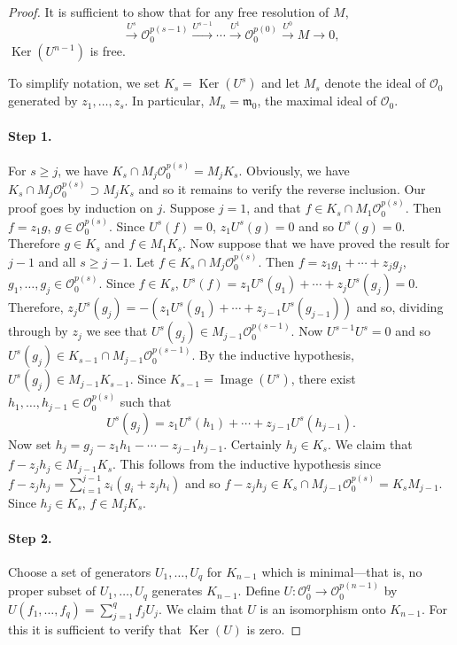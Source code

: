 \begin{proof}
It is sufficient to show that for any free resolution of $M$,
\[\xrightarrow{U^s}\mathcal O_0^{p(s-1)}\xrightarrow{U^{s-1}}\cdots\xrightarrow{U^1}\mathcal O_0^{p(0)}\xrightarrow{U^0}M\to0,\]
$\operatorname{Ker}(U^{n-1})$ is free.

To simplify notation, we set $K_s=\operatorname{Ker}(U^s)$ and let $M_s$ denote the ideal of $\mathcal O_0$ generated by $z_1,\ldots,z_s$. In particular, $M_n=\mathfrak m_0$, the maximal ideal of $\mathcal O_0$.
\paragraph*{Step 1.} For $s\geq j$, we have $K_s\cap M_j\mathcal O_0^{p(s)}=M_jK_s$. Obviously, we have $K_s\cap M_j\mathcal O_0^{p(s)}\supset M_jK_s$ and so it remains to verify the reverse inclusion. Our proof goes by induction on $j$. Suppose $j=1$, and that $f\in K_s\cap M_1\mathcal O_0^{p(s)}$. Then $f=z_1g$, $g\in\mathcal O_0^{p(s)}$. Since $U^s(f)=0$, $z_1U^s(g)=0$ and so $U^s(g)=0$. Therefore $g\in K_s$ and $f\in M_1K_s$. Now suppose that we have proved the result for $j-1$ and all $s\geq j-1$. Let $f\in K_s\cap M_j\mathcal O_0^{p(s)}$. Then $f=z_1g_1+\cdots+z_jg_j$, $g_1,\ldots,g_j\in\mathcal O_0^{p(s)}$. Since $f\in K_s$, $U^s(f)=z_1U^s(g_1)+\cdots+z_jU^s(g_j)=0$. Therefore, $z_jU^s(g_j)=-(z_1U^s(g_1)+\cdots+z_{j-1}U^s(g_{j-1}))$ and so, dividing through by $z_j$ we see that $U^s(g_j)\in M_{j-1}\mathcal O_0^{p(s-1)}$. Now $U^{s-1}U^s=0$ and so $U^s(g_j)\in K_{s-1}\cap M_{j-1}\mathcal O_0^{p(s-1)}$. By the inductive hypothesis, $U^s(g_j)\in M_{j-1}K_{s-1}$. Since $K_{s-1}=\operatorname{Image}(U^s)$, there exist $h_1,\ldots,h_{j-1}\in\mathcal O_0^{p(s)}$ such that
\[U^s(g_j)=z_1U^s(h_1)+\cdots+z_{j-1}U^s(h_{j-1}).\]
Now set $h_j=g_j-z_1h_1-\cdots-z_{j-1}h_{j-1}$. Certainly $h_j\in K_s$. We claim that $f-z_jh_j\in M_{j-1}K_s$. This follows from the inductive hypothesis since $f-z_jh_j=\sum_{i=1}^{j-1}z_i(g_i+z_jh_i)$ and so $f-z_jh_j\in K_s\cap M_{j-1}\mathcal O_0^{p(s)}=K_sM_{j-1}$. Since $h_j\in K_s$, $f\in M_jK_s$.
\paragraph*{Step 2.} Choose a set of generators $U_1,\ldots,U_q$ for $K_{n-1}$ which is minimal---that is, no proper subset of $U_1,\ldots,U_q$ generates $K_{n-1}$. Define $U:\mathcal O_0^q\to\mathcal O_0^{p(n-1)}$ by $U(f_1,\ldots,f_q)=\sum_{j=1}^q f_jU_j$. We claim that $U$ is an isomorphism onto $K_{n-1}$. For this it is sufficient to verify that $\operatorname{Ker}(U)$ is zero.


\end{proof}
